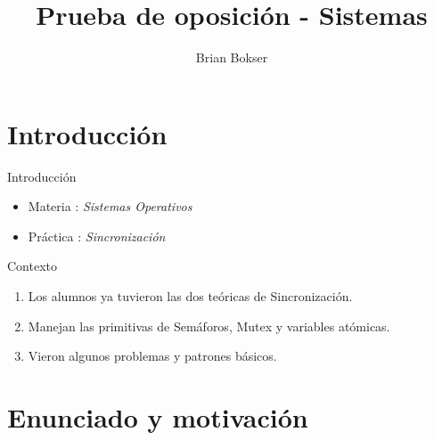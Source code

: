 \documentclass[pdf]{beamer}
\title[Prueba de oposición] %
{Prueba de oposición - Sistemas}
\author[Brian Bokser] %
{Brian Bokser}
\institute[UBA-FCEN] %
{
  Facultad de Ciencias Exactas y Naturales\\
  Universidad de Buenos Aires
}
\begin{document}
\begin{frame}
  \titlepage
\end{frame}




\section{Introducci\'on}

\begin{frame}{Introducci\'on}
    \begin{itemize}
	\item Materia :  \emph{Sistemas Operativos}
	\vspace{2em}
	\item Práctica : \emph{Sincronización}

    \end{itemize}

\end{frame}

\begin{frame}{Contexto}
    \begin{enumerate}
        
        \item{Los alumnos ya tuvieron las dos teóricas de Sincronización. }
        \vspace{2em}
        \item{Manejan las primitivas de Semáforos, Mutex y variables atómicas.}
        \vspace{2em}
        \item{Vieron algunos problemas y patrones básicos.} 
        
    \end{enumerate}
\end{frame}

\section{Enunciado y motivación}
\end{document}
